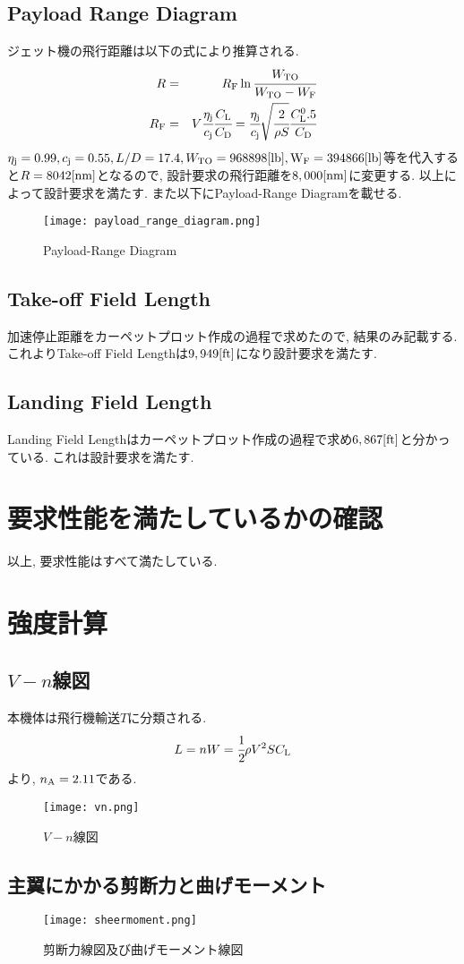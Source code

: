 \documentclass[12pt]{jsarticle}
\begin{document}
\subsection{Payload Range Diagram}
ジェット機の飛行距離は以下の式により推算される.
\begin{eqnarray*}
R &=& R_{\rm F}\ln\cfrac{W_{\rm TO}}{W_{\rm TO} - W_{\rm F}} \\
R_{\rm F} &=& V\cfrac{\eta_{\rm j}}{c_{\rm j}}\cfrac{C_{\rm L}}{C_{\rm D}} = \cfrac{\eta_{\rm j}}{c_{\rm j}}\sqrt{\cfrac{2}{\rho S}}\cfrac{C_{\rm L}^0.5}{C_{\rm D}}
\end{eqnarray*}
$\eta_{\rm j} = 0.99, c_{\rm j} = 0.55, L/D = 17.4, W_{\rm TO} = 968898[\rm lb], W_{\rm F} = 394866[\rm lb]$等を代入すると$R = 8042 [\rm nm]$となるので, 設計要求の飛行距離を$8,000 [\rm nm]$に変更する. 以上によって設計要求を満たす. また以下にPayload-Range Diagramを載せる.
\begin{figure}[H]
\begin{center}
\texttt{[image: payload\_range\_diagram.png]}
\caption{Payload-Range Diagram}
\end{center}
\end{figure}

\subsection{Take-off Field Length}
加速停止距離をカーペットプロット作成の過程で求めたので, 結果のみ記載する. これよりTake-off Field Lengthは$9,949[\rm ft]$になり設計要求を満たす.

\subsection{Landing Field Length}
Landing Field Lengthはカーペットプロット作成の過程で求め$6,867[\rm ft]$と分かっている. これは設計要求を満たす.

\section{要求性能を満たしているかの確認}
以上, 要求性能はすべて満たしている.

\section{強度計算}
\subsection{$V - n$線図}
本機体は飛行機輸送$T$に分類される.
\begin{eqnarray*}
L = nW = \cfrac{1}{2}\rho V^2SC_{\rm L}
\end{eqnarray*}
より, $n_{\rm A} = 2.11$である.
\begin{figure}[H]
\begin{center}
\texttt{[image: vn.png]}
\caption{$V-n$線図}
\end{center}
\end{figure}

\subsection{主翼にかかる剪断力と曲げモーメント}
\begin{figure}[H]
\begin{center}
\texttt{[image: sheermoment.png]}
\caption{剪断力線図及び曲げモーメント線図}
\end{center}
\end{figure}
\end{document}

